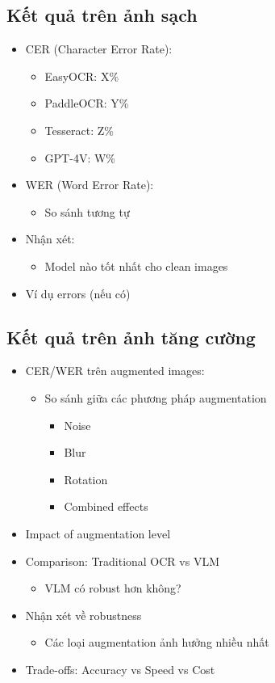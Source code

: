 \subsection{Kết quả trên ảnh sạch}
\begin{itemize}
    \item CER (Character Error Rate):
    \begin{itemize}
        \item EasyOCR: X\%
        \item PaddleOCR: Y\%
        \item Tesseract: Z\%
        \item GPT-4V: W\%
    \end{itemize}
    \item WER (Word Error Rate):
    \begin{itemize}
        \item So sánh tương tự
    \end{itemize}
    \item Nhận xét:
    \begin{itemize}
        \item Model nào tốt nhất cho clean images
    \end{itemize}
    \item Ví dụ errors (nếu có)
\end{itemize}

\subsection{Kết quả trên ảnh tăng cường}
\begin{itemize}
    \item CER/WER trên augmented images:
    \begin{itemize}
        \item So sánh giữa các phương pháp augmentation
        \begin{itemize}
            \item Noise
            \item Blur
            \item Rotation
            \item Combined effects
        \end{itemize}
    \end{itemize}
    \item Impact of augmentation level
    \item Comparison: Traditional OCR vs VLM
    \begin{itemize}
        \item VLM có robust hơn không?
    \end{itemize}
    \item Nhận xét về robustness
    \begin{itemize}
        \item Các loại augmentation ảnh hưởng nhiều nhất
    \end{itemize}
    \item Trade-offs: Accuracy vs Speed vs Cost
\end{itemize}

